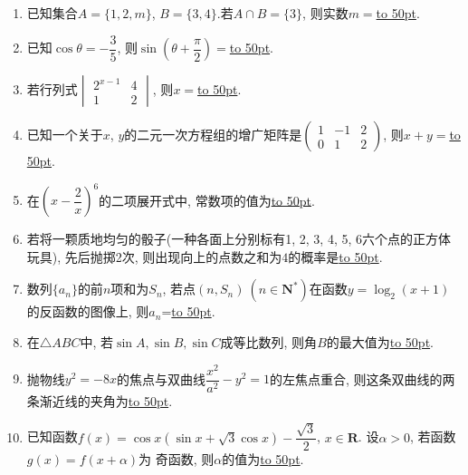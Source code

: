 \documentclass[10pt,a4paper]{article}
\newcommand{\blank}[1]{\underline{\hbox to #1pt{}}}
\begin{document}
\begin{enumerate}[1.]
\item 已知集合$A=\{1,2,m\}$, $B=\{3,4\}$.若$A\cap B=\{3\}$, 则实数$m=$\blank{50}.
\item 已知$\cos\theta=-\dfrac35$, 则$\sin(\theta+\dfrac{\pi}2)=$\blank{50}.
\item 若行列式$\begin{vmatrix} 2^{x-1} & 4  \\ 1 & 2 \end{vmatrix}$, 则$x=$\blank{50}.
\item 已知一个关于$x$, $y$的二元一次方程组的增广矩阵是$\begin{pmatrix} 1 & -1 & 2 \\ 0 & 1 & 2 \end{pmatrix}$, 则$x+y=$\blank{50}.
\item 在$(x-\dfrac2x)^6$的二项展开式中, 常数项的值为\blank{50}.
\item 若将一颗质地均匀的骰子(一种各面上分别标有1, 2, 3, 4, 5, 6六个点的正方体玩具), 先后抛掷2次, 则出现向上的点数之和为$4$的概率是\blank{50}.
\item 数列$\{a_n\}$的前$n$项和为$S_n$, 若点$(n,S_n) \ (n\in \mathbf{N}^*)$在函数$y=\log_2 (x+1)$的反函数的图像上, 则$a_n$=\blank{50}.
\item 在$\triangle ABC$中, 若$\sin A,\sin B,\sin C$成等比数列, 则角$B$的最大值为\blank{50}.
\item 抛物线$y^2=-8x$的焦点与双曲线$\dfrac{x^2}{a^2}-y^2=1$的左焦点重合, 则这条双曲线的两条渐近线的夹角为\blank{50}.
\item 已知函数$f(x)=\cos x(\sin x+\sqrt3\cos x)-\dfrac{\sqrt3}2$, $x\in \mathbf{R}$. 设$\alpha>0$, 若函数$g(x)=f(x+\alpha)$为 奇函数, 则$\alpha$的值为\blank{50}.



\end{enumerate}
\end{document}
